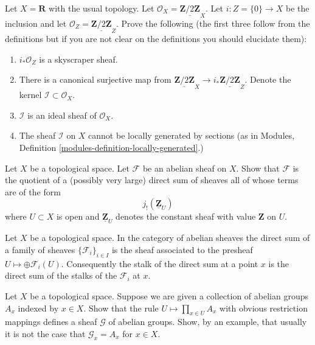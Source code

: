 \begin{exercise}
\label{exercise-not-locally-generated-by-sections}
Let $X = \mathbf{R}$ with the usual topology.
Let $\mathcal{O}_X = \underline{\mathbf{Z}/2\mathbf{Z}}_X$.
Let $i : Z = \{0\} \to X$ be the inclusion and let
$\mathcal{O}_Z = \underline{\mathbf{Z}/2\mathbf{Z}}_Z$.
Prove the following (the first three follow from the definitions but if you
are not clear on the definitions you should elucidate them):
\begin{enumerate}
\item $i_*\mathcal{O}_Z$ is a skyscraper sheaf.
\item There is a canonical surjective map from
$\underline{\mathbf{Z}/2\mathbf{Z}}_X \to
i_*\underline{\mathbf{Z}/2\mathbf{Z}}_Z$.
Denote the kernel $\mathcal{I} \subset \mathcal{O}_X$.
\item $\mathcal{I}$ is an ideal sheaf of $\mathcal{O}_X$.
\item The sheaf $\mathcal{I}$ on $X$ cannot be locally generated
by sections (as in
Modules, Definition \ref{modules-definition-locally-generated}.)
\end{enumerate}
\end{exercise}

\begin{exercise}
\label{exercise-quotient-j-shriek-Z}
Let $X$ be a topological space.
Let ${\mathcal F}$ be an abelian sheaf on $X$. Show
that ${\mathcal F}$ is the quotient of a (possibly very large) direct sum
of sheaves all of whose terms are of the form
$$
j_{!}(\underline{{\mathbf Z}}_U)
$$
where $U \subset X$ is open and $\underline{{\mathbf Z}}_U$ denotes the
constant sheaf with value ${\mathbf Z}$ on $U$.
\end{exercise}

\begin{remark}
\label{remark-direct-sum-stalk-abelian}
Let $X$ be a topological space.
In the category of abelian sheaves the direct sum of
a family of sheaves $\{{\mathcal F}_i\}_{i\in I}$ is the sheaf associated to
the presheaf $U \mapsto \oplus {\mathcal F}_i(U)$. Consequently the stalk of
the direct sum at a point $x$ is the direct sum of the stalks of the
${\mathcal F}_i$ at $x$.
\end{remark}

\begin{exercise}
\label{exercise-product-over-points}
Let $X$ be a topological space. Suppose we are given a collection of
abelian groups $A_x$ indexed by $x \in X$. Show that the rule
$U \mapsto \prod_{x \in U} A_x$ with obvious restriction mappings
defines a sheaf $\mathcal{G}$ of abelian groups. Show, by an example,
that usually it is not the case that $\mathcal{G}_x = A_x$ for $x \in X$.
\end{exercise}

